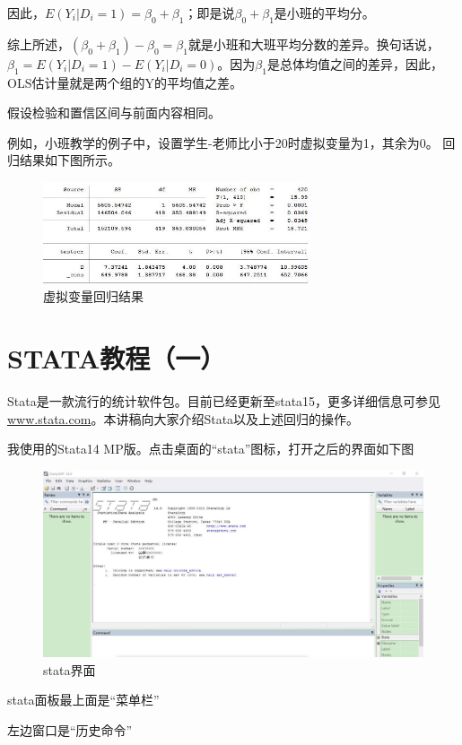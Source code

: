 \documentclass[cn,12pt,math=newtx,citestyle=gb7714-2015,bibstyle=gb7714-2015]{elegantbook}
\begin{document}
	因此，$E(Y_i|D_i=1)=\beta_0+\beta_1$；即是说$\beta_0+\beta_1$是小班的平均分。
	
	综上所述，$(\beta_0+\beta_1)-\beta_0=\beta_1$就是小班和大班平均分数的差异。换句话说，$\beta_1=E(Y_i|D_i=1)-E(Y_i|D_i=0)$。因为$\beta_1$是总体均值之间的差异，因此，OLS估计量就是两个组的Y的平均值之差。
	
	假设检验和置信区间与前面内容相同。
	
	例如，小班教学的例子中，设置学生-老师比小于20时虚拟变量为1，其余为0。 回归结果如下图所示。
	\begin{figure}[htbp]
		\centering
		\includegraphics[width=0.7\textwidth]{dummy.jpg}
		\caption{虚拟变量回归结果}\label{fig:digit}
	\end{figure}
	
	
	\section{STATA教程（一）}
	Stata是一款流行的统计软件包。目前已经更新至stata15，更多详细信息可参见\url{www.stata.com}。本讲稿向大家介绍Stata以及上述回归的操作。
	
	我使用的Stata14 MP版。点击桌面的“stata”图标，打开之后的界面如下图
	\begin{figure}[htbp]
		\centering
		\includegraphics[width=1\textwidth]{stata.jpg}
		\caption{stata界面}\label{fig:digit}
	\end{figure}
	
	stata面板最上面是“菜单栏”
	
	左边窗口是“历史命令”
	
\end{document}
